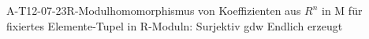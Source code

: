 
\begin{EXA}{A-T12-07-23}{R-Modulhomomorphismus von Koeffizienten aus $R^n$ in M für fixiertes Elemente-Tupel in R-Moduln: Surjektiv gdw Endlich erzeugt}
\end{EXA}
